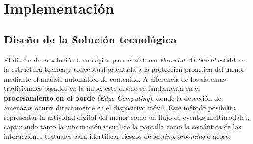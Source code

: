 \chapter{Implementación}
\label{ch:implementacion}


\insertminitoc
\parindent0pt


\section{Diseño de la Solución tecnológica}
El diseño de la solución tecnológica para el sistema \textit{Parental AI Shield} establece la estructura técnica y conceptual orientada a la protección proactiva del menor mediante el análisis automático de contenido. A diferencia de los sistemas tradicionales basados en la nube, este diseño se fundamenta en el \textbf{procesamiento en el borde} (\textit{Edge Computing}), donde la detección de amenazas ocurre directamente en el dispositivo móvil. Este método posibilita representar la actividad digital del menor como un flujo de eventos multimodales, capturando tanto la información visual de la pantalla como la semántica de las interacciones textuales para identificar riesgos de \textit{sexting}, \textit{grooming} o acoso.

